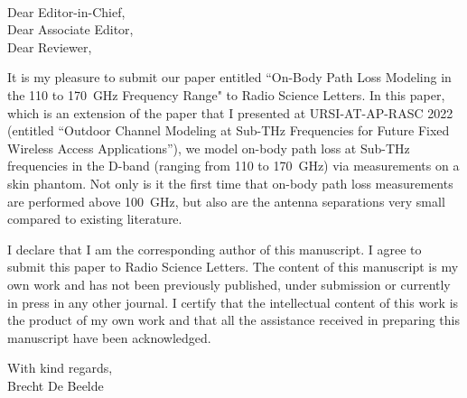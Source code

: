 \documentclass[fontsize=12pt, paper=a4]{letter}
\begin{document}
\begin{letter}{~}

\opening{Dear Editor-in-Chief, \\Dear Associate Editor, \\Dear Reviewer,} 


It is my pleasure to submit our paper entitled ``On-Body Path Loss Modeling in the 110 to 170~GHz Frequency Range" to Radio Science Letters. 
In this paper, which is an extension of the paper that I presented at URSI-AT-AP-RASC 2022 (entitled ``Outdoor Channel Modeling at Sub-THz Frequencies for Future Fixed Wireless Access Applications''), we model on-body path loss at Sub-THz frequencies in the D-band (ranging from 110 to 170~GHz) via measurements on a skin phantom.
Not only is it the first time that on-body path loss measurements are performed above 100~GHz, but also are the antenna separations very small compared to existing literature.

I declare that I am the corresponding author of this manuscript. 
I agree to submit this paper to Radio Science Letters. 
The content of this manuscript is my own work and has not been previously published, under submission or currently in press in any other journal. 
I certify that the intellectual content of this work is the product of my own work and that all the assistance received in preparing this manuscript have been acknowledged. 


\closing{With kind regards, \\Brecht De Beelde} 

\end{letter}
\end{document}
